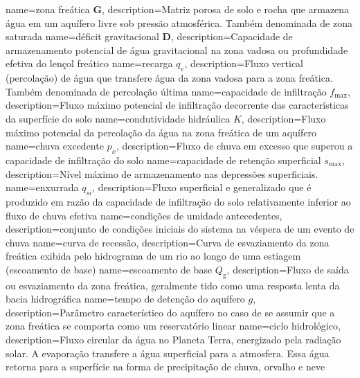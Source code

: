 {
    name=zona freática $\textbf{G}$,
    description={Matriz porosa de solo e rocha que armazena água em um aquífero livre sob pressão atmosférica. Também denominada de zona saturada}
}
{
    name=déficit gravitacional $\textbf{D}$,
    description={Capacidade de armazenamento potencial de água gravitacional na zona vadosa ou profundidade efetiva do lençol freático}
}
{
    name=recarga $q_{\text{v}}$,
    description={Fluxo vertical (percolação) de água que transfere água da zona vadosa para a zona freática. Também denominada de percolação última}
}
{
    name=capacidade de infiltração $f_{\text{max}}$,
    description={Fluxo máximo potencial de infiltração decorrente das características da superfície do solo}
}
{
    name=condutividade hidráulica $K$,
    description={Fluxo máximo potencial da percolação da água na zona freática de um aquífero}
}
{
    name=chuva excedente $p_{x}$,
    description={Fluxo de chuva em excesso que superou a capacidade de infiltração do solo}
}
{
    name=capacidade de retenção superficial $s_{\text{max}}$,
    description={Nível máximo de armazenamento nas depressões superficiais.}
}
{
    name=enxurrada $q_{si}$,
    description={Fluxo superficial e generalizado que é produzido em razão da capacidade de infiltração do solo relativamente inferior ao fluxo de chuva efetiva}
}
{
    name=condições de umidade antecedentes,
    description={conjunto de condições iniciais do sistema na véspera de um evento de chuva}
}
{
    name=curva de recessão,
    description={Curva de esvaziamento da zona freática exibida pelo hidrograma de um rio ao longo de uma estiagem (escoamento de base)}
}
{
    name=escoamento de base $Q_{\text{g}}$,
    description={Fluxo de saída ou esvaziamento da zona freática, geralmente tido como uma resposta lenta da bacia hidrográfica}
}
{
    name=tempo de detenção do aquífero $g$,
    description={Parâmetro característico do aquífero no caso de se assumir que a zona freática se comporta como um reservatório linear}
}
{
    name=ciclo hidrológico,
    description={Fluxo circular da água no Planeta Terra, energizado pela radiação solar. A evaporação transfere a água superficial para a atmosfera. Essa água retorna para a superfície na forma de precipitação de chuva, orvalho e neve}
}
